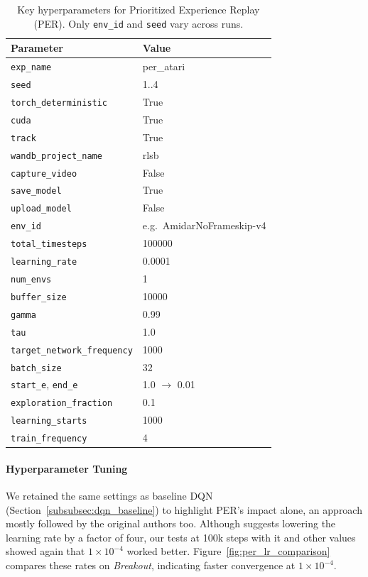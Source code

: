 \begin{table}
	\caption{Key hyperparameters for Prioritized Experience Replay (PER). Only \texttt{env\_id} and \texttt{seed} vary across runs.}
	\label{tab:per_hyperparams}
	\centering
	\begin{tabular}{ll}
		\toprule
		\textbf{Parameter} & \textbf{Value} \\
		\midrule
		\texttt{exp\_name}                & per\_atari \\
		\texttt{seed}                     & 1..4 \\
		\texttt{torch\_deterministic}     & True \\
		\texttt{cuda}                     & True \\
		\texttt{track}                    & True \\
		\texttt{wandb\_project\_name}     & rlsb \\
		\texttt{capture\_video}           & False \\
		\texttt{save\_model}              & True \\
		\texttt{upload\_model}            & False \\
		\texttt{env\_id}                  & e.g.\ AmidarNoFrameskip-v4 \\
		\texttt{total\_timesteps}         & 100000 \\
		\texttt{learning\_rate}           & 0.0001 \\
		\texttt{num\_envs}                & 1 \\
		\texttt{buffer\_size}             & 10000 \\
		\texttt{gamma}                    & 0.99 \\
		\texttt{tau}                      & 1.0 \\
		\texttt{target\_network\_frequency} & 1000 \\
		\texttt{batch\_size}             & 32 \\
		\texttt{start\_e}, \texttt{end\_e} & 1.0 $\to$ 0.01 \\
		\texttt{exploration\_fraction}    & 0.1 \\
		\texttt{learning\_starts}         & 1000 \\
		\texttt{train\_frequency}         & 4 \\
		\bottomrule
	\end{tabular}
\end{table}

\paragraph{Hyperparameter Tuning}
We retained the same settings as baseline DQN (Section~\ref{subsubsec:dqn_baseline}) to highlight PER’s impact alone, an approach mostly followed by the original authors too. Although \cite{schaul:prioritized} suggests lowering the learning rate by a factor of four, our tests at 100k steps with it and other values showed again that $1\times10^{-4}$ worked better. Figure~\ref{fig:per_lr_comparison} compares these rates on \emph{Breakout}, indicating faster convergence at $1\times10^{-4}$.  

